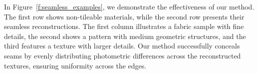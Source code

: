 In Figure~\ref{f:seamless_examples}, we demonstrate the effectiveness of our method. The first row shows non-tileable materials, while the second row presents their seamless reconstructions. The first column illustrates a fabric sample with fine details, the second shows a pattern with medium geometric structures, and the third features a texture with larger details. Our method successfully conceals seams by evenly distributing photometric differences across the reconstructed textures, ensuring uniformity across the edges.


